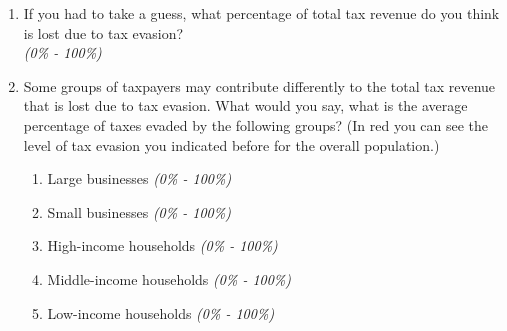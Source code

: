 \documentclass[11pt]{article}
\begin{document}
\begin{enumerate}[resume]
    \item If you had to take a guess, what percentage of total tax revenue do you think is lost due to tax evasion? \\
    \textit{(0\% - 100\%)}
    \item Some groups of taxpayers may contribute differently to the total tax revenue that is lost due to tax evasion. What would you say, what is the average percentage of taxes evaded by the following groups? (In red you can see the level of tax evasion you indicated before for the overall population.)
    \begin{enumerate}[label=\alph*)]
        \item Large businesses \textit{(0\% - 100\%)}
        \item Small businesses \textit{(0\% - 100\%)}
        \item High-income households \textit{(0\% - 100\%)}
        \item Middle-income households \textit{(0\% - 100\%)}
        \item Low-income households \textit{(0\% - 100\%)}
    \end{enumerate}
\end{enumerate}

\vspace{1em}
\end{document}
